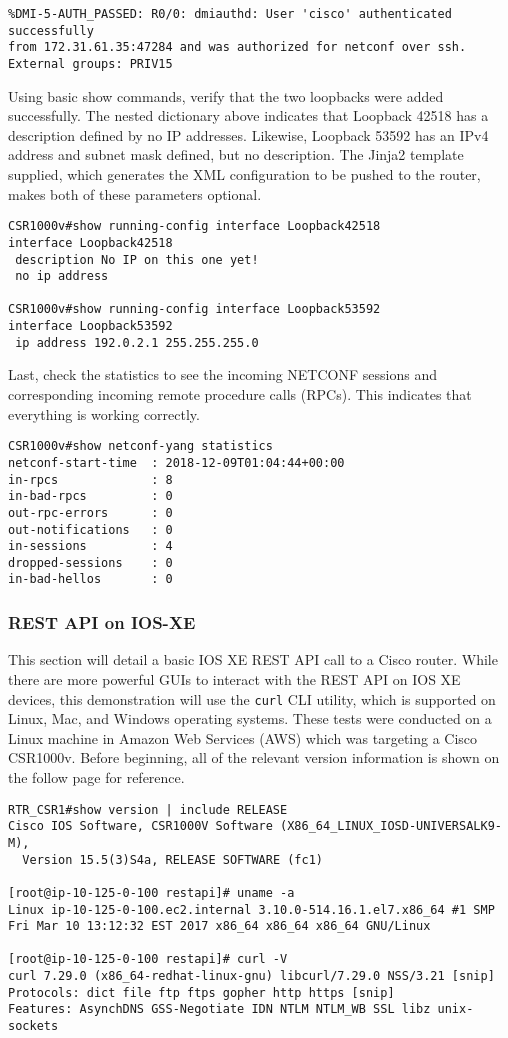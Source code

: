 \begin{verbatim}
%DMI-5-AUTH_PASSED: R0/0: dmiauthd: User 'cisco' authenticated successfully
from 172.31.61.35:47284 and was authorized for netconf over ssh. External groups: PRIV15
\end{verbatim}

Using basic show commands, verify that the two loopbacks were added
successfully. The nested dictionary above indicates that Loopback 42518 has a
description defined by no IP addresses. Likewise, Loopback 53592 has an IPv4
address and subnet mask defined, but no description. The Jinja2 template
supplied, which generates the XML configuration to be pushed to the router,
makes both of these parameters optional.

\begin{verbatim}
CSR1000v#show running-config interface Loopback42518
interface Loopback42518
 description No IP on this one yet!
 no ip address

CSR1000v#show running-config interface Loopback53592
interface Loopback53592
 ip address 192.0.2.1 255.255.255.0
\end{verbatim}

Last, check the statistics to see the incoming NETCONF sessions and
corresponding incoming remote procedure calls (RPCs). This indicates that
everything is working correctly.

\begin{verbatim}
CSR1000v#show netconf-yang statistics 
netconf-start-time  : 2018-12-09T01:04:44+00:00
in-rpcs             : 8
in-bad-rpcs         : 0
out-rpc-errors      : 0
out-notifications   : 0
in-sessions         : 4
dropped-sessions    : 0
in-bad-hellos       : 0
\end{verbatim}

\subsubsection{REST API on IOS-XE}
This section will detail a basic IOS XE REST API call to a Cisco router. While
there are more powerful GUIs to interact with the REST API on IOS XE devices,
this demonstration will use the \verb|curl| CLI utility, which is supported on
Linux, Mac, and Windows operating systems. These tests were conducted on a
Linux machine in Amazon Web Services (AWS) which was targeting a Cisco
CSR1000v. Before beginning, all of the relevant version information is shown
on the follow page for reference.

\begin{verbatim}
RTR_CSR1#show version | include RELEASE  
Cisco IOS Software, CSR1000V Software (X86_64_LINUX_IOSD-UNIVERSALK9-M),
  Version 15.5(3)S4a, RELEASE SOFTWARE (fc1)

[root@ip-10-125-0-100 restapi]# uname -a
Linux ip-10-125-0-100.ec2.internal 3.10.0-514.16.1.el7.x86_64 #1 SMP
Fri Mar 10 13:12:32 EST 2017 x86_64 x86_64 x86_64 GNU/Linux

[root@ip-10-125-0-100 restapi]# curl -V
curl 7.29.0 (x86_64-redhat-linux-gnu) libcurl/7.29.0 NSS/3.21 [snip]
Protocols: dict file ftp ftps gopher http https [snip]
Features: AsynchDNS GSS-Negotiate IDN NTLM NTLM_WB SSL libz unix-sockets
\end{verbatim}

